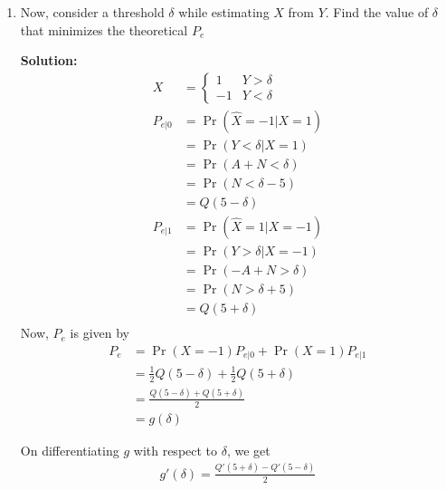\documentclass[journal,12pt,twocolumn]{IEEEtran}
\newcommand{\solution}{\noindent \textbf{Solution: }}
\providecommand{\pr}[1]{\ensuremath{\Pr\left(#1\right)}}
\numberwithin{equation}{section}
\renewcommand\thesection{\arabic{section}}
\begin{document}
\begin{enumerate}[label=\thesection.\arabic*,ref=\thesection.\theenumi]
	\solution Download the following Python code that plots Fig. \ref{fig-5.7}
	\begin{lstlisting}
		wget https://github.com/Ankit-Saha-2003/AI1110/raw/main/Random-Numbers/codes/5.7.py
	\end{lstlisting}
	Run the code by executing
	\begin{lstlisting}
		python 5.7.py
	\end{lstlisting}
	\begin{figure}
		\centering
		\texttt{[image: ./figs/5.7.png]}
		\caption{Plot of $P_e$}
		\label{fig-5.7}
	\end{figure}
	
	\item Now, consider a threshold $\delta$  while estimating $X$ from $Y$. Find the value of $\delta$ that minimizes the theoretical $P_e$
	
	\solution 
	\begin{align}
		X &= 
		\begin{cases}
			1 & Y > \delta \\
			-1 & Y < \delta
		\end{cases} \\
		P_{e|0} &= \pr{\hat{X} = -1|X=1} \\
		&= \pr{Y<\delta | X=1} \\
		&= \pr{A+N < \delta} \\
		&= \pr{N < \delta - 5} \\
		&= Q(5 - \delta) \\
		P_{e|1} &= \pr{\hat{X} = 1|X=-1} \\
		&= \pr{Y>\delta | X=-1} \\
		&= \pr{-A+N > \delta} \\
		&= \pr{N > \delta + 5} \\
		&= Q(5 + \delta) \\
	\end{align}
	Now, $P_e$ is given by
	\begin{align}
		P_e &= \pr{X=-1} P_{e|0} + \pr{X=1} P_{e|1} \\
		&= \frac12 Q(5 - \delta) + \frac12 Q(5 + \delta) \\
		&= \frac{Q(5 - \delta) + Q(5 + \delta)}{2} \\
		&= g(\delta) 
	\end{align}
	
	On differentiating $g$ with respect to $\delta$, we get
	\begin{align}
		g'(\delta) = \frac{Q'(5 + \delta) - Q'(5 - \delta)}{2}
	\end{align}
	

\end{enumerate}
\end{document}
